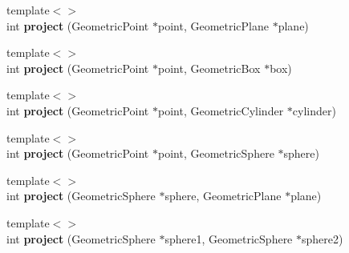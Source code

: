 \begin{DoxyCompactItemize}
\item 
\hypertarget{classhiqp_1_1tasks_1_1TaskGeometricProjection_ae6653b1cf797c4b4ff375bd033a68ef1}{{\footnotesize template$<$$>$ }\\int {\bfseries project} (Geometric\-Point $\ast$point, Geometric\-Plane $\ast$plane)}\label{classhiqp_1_1tasks_1_1TaskGeometricProjection_ae6653b1cf797c4b4ff375bd033a68ef1}

\item 
\hypertarget{classhiqp_1_1tasks_1_1TaskGeometricProjection_a9ea4c40950f0bfa6152ce1b65a8c3d09}{{\footnotesize template$<$$>$ }\\int {\bfseries project} (Geometric\-Point $\ast$point, Geometric\-Box $\ast$box)}\label{classhiqp_1_1tasks_1_1TaskGeometricProjection_a9ea4c40950f0bfa6152ce1b65a8c3d09}

\item 
\hypertarget{classhiqp_1_1tasks_1_1TaskGeometricProjection_adf1cde404a412303ef120f5da4316daf}{{\footnotesize template$<$$>$ }\\int {\bfseries project} (Geometric\-Point $\ast$point, Geometric\-Cylinder $\ast$cylinder)}\label{classhiqp_1_1tasks_1_1TaskGeometricProjection_adf1cde404a412303ef120f5da4316daf}

\item 
\hypertarget{classhiqp_1_1tasks_1_1TaskGeometricProjection_a3d55ec9388e43cc88b166c713b071fd0}{{\footnotesize template$<$$>$ }\\int {\bfseries project} (Geometric\-Point $\ast$point, Geometric\-Sphere $\ast$sphere)}\label{classhiqp_1_1tasks_1_1TaskGeometricProjection_a3d55ec9388e43cc88b166c713b071fd0}

\item 
\hypertarget{classhiqp_1_1tasks_1_1TaskGeometricProjection_a5d7494ae8bc91c5dc1415467339966d9}{{\footnotesize template$<$$>$ }\\int {\bfseries project} (Geometric\-Sphere $\ast$sphere, Geometric\-Plane $\ast$plane)}\label{classhiqp_1_1tasks_1_1TaskGeometricProjection_a5d7494ae8bc91c5dc1415467339966d9}

\item 
\hypertarget{classhiqp_1_1tasks_1_1TaskGeometricProjection_a497ae13dedcbc22e5a78654d4ca83d75}{{\footnotesize template$<$$>$ }\\int {\bfseries project} (Geometric\-Sphere $\ast$sphere1, Geometric\-Sphere $\ast$sphere2)}\label{classhiqp_1_1tasks_1_1TaskGeometricProjection_a497ae13dedcbc22e5a78654d4ca83d75}

\end{DoxyCompactItemize}
